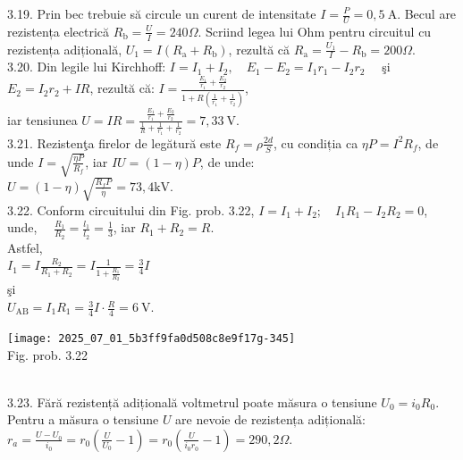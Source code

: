 3.19. Prin bec trebuie să circule un curent de intensitate $I=\frac{P}{U}=0,5 \mathrm{~A}$. Becul are rezistența electrică $R_{\mathrm{b}}=\frac{U}{I}=240 \Omega$. Scriind legea lui Ohm pentru circuitul cu rezistența adițională, $U_{1}=I\left(R_{\mathrm{a}}+R_{\mathrm{b}}\right)$, rezultă că $R_{\mathrm{a}}=\frac{U_{1}}{I}-R_{\mathrm{b}}=200 \Omega$.\\

3.20. Din legile lui Kirchhoff: $I=I_{1}+I_{2}, \quad E_{1}-E_{2}=I_{1} r_{1}-I_{2} r_{2} \quad$ şi $E_{2}=I_{2} r_{2}+I R$, rezultă că: $I=\frac{\frac{E_{1}}{r_{1}}+\frac{E_{2}}{r_{2}}}{1+R\left(\frac{1}{r_{1}}+\frac{1}{r_{2}}\right)}$,\\ iar tensiunea $U=I R=\frac{\frac{E_{1}}{r_{1}}+\frac{E_{2}}{r_{2}}}{\frac{1}{R}+\frac{1}{r_{1}}+\frac{1}{r_{2}}}=7,33 \mathrm{~V}$.\\

3.21. Rezistenţa firelor de legătură este $R_{f}=\rho \frac{2 d}{S}$, cu condiția ca $\eta P=I^{2} R_{f}$, de unde $I=\sqrt{\frac{\eta P}{R_{f}}}$, iar $I U=(1-\eta) P$, de unde:\\ $U=(1-\eta) \sqrt{\frac{R_{f} P}{\eta}}=73,4 \mathrm{kV}$.\\

3.22. Conform circuitului din Fig. prob. 3.22, $I=I_{1}+I_{2} ; \quad I_{1} R_{1}-I_{2} R_{2}=0$,\\ unde, $\quad \frac{R_{1}}{R_{2}}=\frac{l_{1}}{l_{2}}=\frac{1}{3}$, iar $R_{1}+R_{2}=R$.\\ Astfel,\\ $I_{1}=I \frac{R_{2}}{R_{1}+R_{2}}=I \frac{1}{1+\frac{R_{1}}{R_{2}}}=\frac{3}{4} I$\\ şi\\ $U_{\mathrm{AB}}=I_{1} R_{1}=\frac{3}{4} I \cdot \frac{R}{4}=6 \mathrm{~V}$.\\ \begin{center} \texttt{[image: 2025\_07\_01\_5b3ff9fa0d508c8e9f17g-345]}\\ Fig. prob. 3.22 \end{center}\\

3.23. Fără rezistență adițională voltmetrul poate măsura o tensiune $U_{0}=i_{0} R_{0}$. Pentru a măsura o tensiune $U$ are nevoie de rezistența adițională:\\ $r_{a}=\frac{U-U_{0}}{i_{0}}=r_{0}\left(\frac{U}{U_{0}}-1\right)=r_{0}\left(\frac{U}{i_{0} r_{0}}-1\right)=290,2 \Omega$.\\

